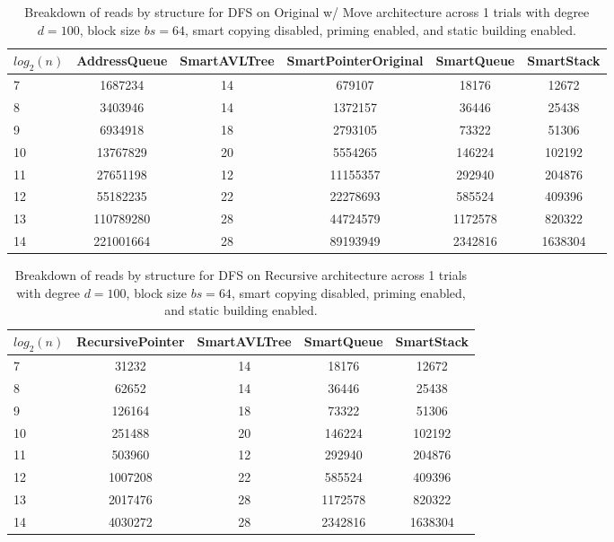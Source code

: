 \begin{table}[]
\centering
\begin{tabular}{|l|c|c|c|c|c|}
$log_2(n)$ & AddressQueue & SmartAVLTree & SmartPointerOriginal & SmartQueue & SmartStack \\ \hline
7 & 1687234 & 14 & 679107 & 18176 & 12672 \\ \hline
8 & 3403946 & 14 & 1372157 & 36446 & 25438 \\ \hline
9 & 6934918 & 18 & 2793105 & 73322 & 51306 \\ \hline
10 & 13767829 & 20 & 5554265 & 146224 & 102192 \\ \hline
11 & 27651198 & 12 & 11155357 & 292940 & 204876 \\ \hline
12 & 55182235 & 22 & 22278693 & 585524 & 409396 \\ \hline
13 & 110789280 & 28 & 44724579 & 1172578 & 820322 \\ \hline
14 & 221001664 & 28 & 89193949 & 2342816 & 1638304 \\ \hline
\end{tabular}
\caption{Breakdown of reads by structure for DFS on Original w/ Move architecture across 1 trials with degree $d=100$, block size $bs=64$, smart copying disabled, priming enabled, and static building enabled.}
    \label{tab:reads_by_structure_dfs_d100_bs64_trials1_copiesfalse_primetrue_staticinsertiontrue_ptoriginal_movetrue}
\end{table}

\begin{table}[]
\centering
\begin{tabular}{|l|c|c|c|c|}
$log_2(n)$ & RecursivePointer & SmartAVLTree & SmartQueue & SmartStack \\ \hline
7 & 31232 & 14 & 18176 & 12672 \\ \hline
8 & 62652 & 14 & 36446 & 25438 \\ \hline
9 & 126164 & 18 & 73322 & 51306 \\ \hline
10 & 251488 & 20 & 146224 & 102192 \\ \hline
11 & 503960 & 12 & 292940 & 204876 \\ \hline
12 & 1007208 & 22 & 585524 & 409396 \\ \hline
13 & 2017476 & 28 & 1172578 & 820322 \\ \hline
14 & 4030272 & 28 & 2342816 & 1638304 \\ \hline
\end{tabular}
\caption{Breakdown of reads by structure for DFS on Recursive architecture across 1 trials with degree $d=100$, block size $bs=64$, smart copying disabled, priming enabled, and static building enabled.}
    \label{tab:reads_by_structure_dfs_d100_bs64_trials1_copiesfalse_primetrue_staticinsertiontrue_ptrecursive_movetrue}
\end{table}

